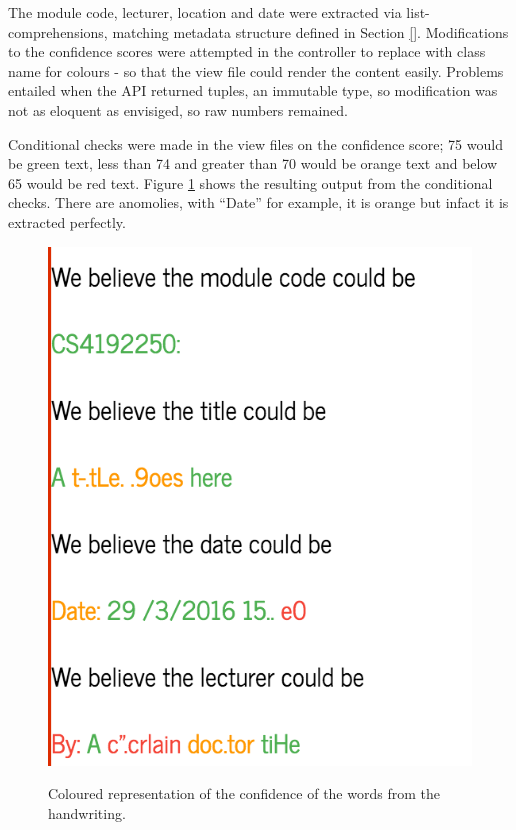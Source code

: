 {{{{{{The module code, lecturer, location and date were extracted via list-comprehensions, matching metadata structure defined in Section \ref{}. Modifications to the confidence scores were attempted in the controller to replace with class name for colours - so that the view file could render the content easily. Problems entailed when the API returned tuples, an immutable type, so modification was not as eloquent as envisiged, so raw numbers remained.

Conditional checks were made in the view files on the confidence score; 75 would be green text, less than 74 and greater than 70 would be orange text and below 65 would be red text. Figure \ref{fig:tesseract_colour} shows the resulting output from the conditional checks. There are anomolies, with ``Date'' for example, it is orange but infact it is extracted perfectly.
\begin{figure}[H]
  \centering
  \includegraphics{images/tesseract_colour}
  \label{fig:tesseract_colour}
  \caption{Coloured representation of the confidence of the words from the handwriting.}
\end{figure}

}}}}}}
